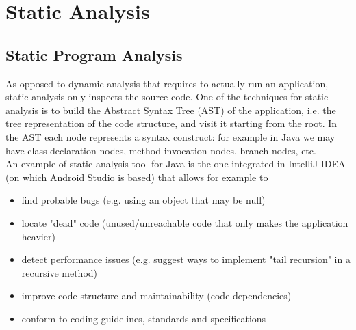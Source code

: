 \documentclass[11pt,a4paper,notitlepage]{article}
\begin{document}
\section{Static Analysis}

\subsection{Static Program Analysis}
As opposed to dynamic analysis that requires to actually run an application, static analysis only inspects the source code. One of the techniques for static analysis is  to build the Abstract Syntax Tree (AST) of the application, i.e. the tree representation of the code structure, and visit it starting from the root. In the AST each node represents a syntax construct: for example in Java we may have class declaration nodes, method invocation nodes, branch nodes, etc.\medskip \\
An example of static analysis tool for Java is the one integrated in IntelliJ IDEA (on which Android Studio is based) that allows for example to
\begin{itemize}
	\item find probable bugs (e.g. using an object that may be null)
	\item locate "dead" code (unused/unreachable code that only makes the application heavier)
	\item detect performance issues (e.g. suggest ways to implement "tail recursion" in a recursive method)
	\item improve code structure and maintainability (code dependencies)
	\item conform to coding guidelines, standards and specifications
\end{itemize}
\end{document}
